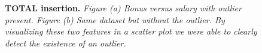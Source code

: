 \documentclass[twoside,openright,titlepage,numbers=noenddot,headinclude,%
               footinclude=true,cleardoublepage=empty,abstractoff,BCOR=5mm,%
               paper=a4,fontsize=11pt,ngerman,american]{scrreprt}
\numberwithin{theorem}{chapter}
\numberwithin{definition}{chapter}
\numberwithin{algorithm}{chapter}
\numberwithin{figure}{chapter}
\numberwithin{table}{chapter}
\numberwithin{equation}{chapter}
\begin{document}
\begin{figure}[!hbtp]
\centering
    
    \caption{\textbf{TOTAL insertion.} \textit{Figure (a) Bonus versus salary with outlier present. Figure (b) Same dataset but without the outlier. By visualizing these two features in a scatter plot we were able to clearly detect the existence of an outlier.}}
\end{figure}
\end{document}

